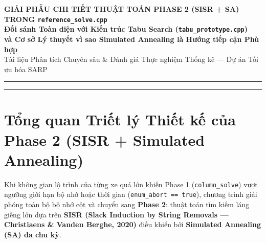 \documentclass[11pt,a4paper]{article}
\theoremstyle{definition}
\begin{document}
\begin{center}
    {\LARGE\bfseries\textcolor{primaryblue}{GIẢI PHẪU CHI TIẾT THUẬT TOÁN PHASE 2 (SISR + SA) TRONG \texttt{reference\_solve.cpp}}}\\[0.25cm]
    {\Large\bfseries Đối sánh Toàn diện với Kiến trúc Tabu Search (\texttt{tabu\_prototype.cpp})\\và Cơ sở Lý thuyết vì sao Simulated Annealing là Hướng tiếp cận Phù hợp}\\[0.35cm]
    {\normalsize Tài liệu Phân tích Chuyên sâu \& Đánh giá Thực nghiệm Thống kê --- Dự án Tối ưu hóa SARP}\\[0.2cm]
    \rule{\linewidth}{1.2pt}
\end{center}

\tableofcontents
\vspace{0.4cm}
\rule{\linewidth}{0.5pt}
\newpage

\section{Tổng quan Triết lý Thiết kế của Phase 2 (SISR + Simulated Annealing)}

Khi không gian lộ trình của từng xe quá lớn khiến Phase 1 (\texttt{column\_solve}) vượt ngưỡng giới hạn bộ nhớ hoặc thời gian (\texttt{enum\_abort == true}), chương trình giải phóng toàn bộ bộ nhớ cột và chuyển sang \textbf{Phase 2}: thuật toán tìm kiếm láng giềng lớn dựa trên \textbf{SISR (Slack Induction by String Removals --- Christiaens \& Vanden Berghe, 2020)} điều khiển bởi \textbf{Simulated Annealing (SA) đa chu kỳ}.
\end{document}
